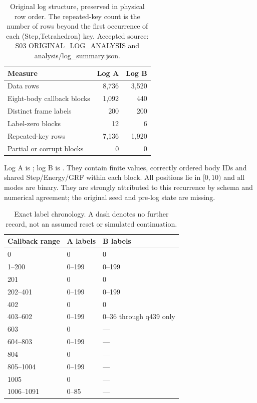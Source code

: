 \begin{table}[htbp]\centering\small
\caption{Original log structure, preserved in physical row order.
The repeated-key count is the number of rows beyond the first occurrence
of each (Step,Tetrahedron) key. Accepted source: S03
ORIGINAL\_LOG\_ANALYSIS and analysis/log\_summary.json.}\label{tab:counts03}
\begin{tabular}{@{}lrr@{}}\toprule
Measure & Log A & Log B\\\midrule
Data rows &8,736&3,520\\
Eight-body callback blocks &1,092&440\\
Distinct frame labels &200&200\\
Label-zero blocks &12&6\\
Repeated-key rows &7,136&1,920\\
Partial or corrupt blocks &0&0\\\bottomrule
\end{tabular}
\end{table}

Log A is ;
log B is .
They contain finite values, correctly ordered body IDs and shared
Step/Energy/GRF within each block. All positions lie in $[0,10)$ and
all modes are binary. They are strongly attributed to this recurrence
by schema and numerical agreement; the original seed and pre-log
state are missing. 

\begin{table}[htbp]\centering\small
\caption{Exact label chronology. A dash denotes no further record,
not an assumed reset or simulated continuation.}\label{tab:segments03}
\begin{tabular}{@{}lll@{}}\toprule
Callback range & A labels & B labels\\\midrule
0 &0&0\\
1--200 &0--199&0--199\\
201 &0&0\\
202--401 &0--199&0--199\\
402 &0&0\\
403--602 &0--199&0--36 through q439 only\\
603 &0&---\\
604--803 &0--199&---\\
804 &0&---\\
805--1004 &0--199&---\\
1005 &0&---\\
1006--1091 &0--85&---\\\bottomrule
\end{tabular}
\end{table}

